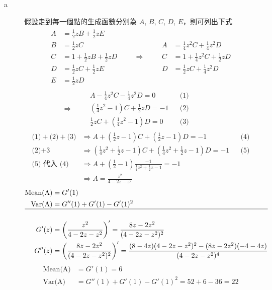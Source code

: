 \documentclass[11pt,fleqn]{article}
\begin{document}
\begin{description}
	\item[a] 假設走到每一個點的生成函數分別為 $A$, $B$, $C$, $D$, $E$，則可列出下式
		\begin{align*}
			\begin{aligned}
				A &= \frac{1}{2}z B + \frac{1}{2}z E\\
				B &= \frac{1}{2}z C\\
				C &= 1 + \frac{1}{2}z B + \frac{1}{2} z D\\
				D &= \frac{1}{2}z C + \frac{1}{2} z E\\
				E &= \frac{1}{2}z D 
			\end{aligned} \qquad
			\Rightarrow \qquad
			\begin{aligned}
				A &= \frac{1}{4}z^2 C + \frac{1}{4}z^2 D\\
				C &= 1 + \frac{1}{4}z^2 C + \frac{1}{2} z D\\
				D &= \frac{1}{2}z C + \frac{1}{4} z^2 D
			\end{aligned} \\
			\qquad
			\Rightarrow \qquad
			\begin{aligned}
				A - \frac{1}{4}z^2 C - \frac{1}{4}z^2 D = 0 && \text{(1)}\\
				\left(\frac{1}{4}z^2-1\right) C + \frac{1}{2} z D = -1 && \text{(2)}\\
				\frac{1}{2}z C + \left(\frac{1}{4} z^2 - 1\right) D = 0 && \text{(3)}
			\end{aligned}
		\end{align*}
		\begin{align*}
			\hline
			\text{(1)} + \text{(2)} + \text{(3)} 
				& \Rightarrow 
					A + \left(\frac{1}{2} z - 1\right) C +
								\left(\frac{1}{2} z - 1\right) D = -1
					&& \text{(4)} \\
			\text{(2)} + \text{3}
				& \Rightarrow 
					\left(\frac{1}{4}z^2 + \frac{1}{2}z - 1\right) C +
						\left(\frac{1}{4}z^2 + \frac{1}{2}z - 1\right) D = -1
					&& \text{(5)} \\
			\text{(5) 代入 (4)}
				& \Rightarrow
					A + \left(\frac{1}{2}-1\right) 
						\frac{-1}{\frac{1}{4}z^2 + \frac{1}{2}z -1} = -1 \\
				& \Rightarrow
					A = \frac{z^2}{4 - 2z - z^2}
		\end{align*}
		\begin{align*}
			\text{Mean(A)} &= {G}'(1) \\
			\text{Var(A)} &= {G}''(1) + {G}'(1) - {G}'(1)^2 \\
			\hline \\
			{G}'(z) &= {\left(\frac{z^2}{4 - 2z - z^2}\right)}' 
					= \frac{8z-2z^2}{(4-2z-z^2)^2} \\
			{G}''(z) &= {\left(\frac{8z-2z^2}{(4-2z-z^2)^2}\right)}' 
					= \frac{(8-4z)(4-2z-z^2)^2 - (8z-2z^2)(-4-4z)}{(4-2z-z^2)^4}
		\end{align*}
		\begin{align*}
			\text{Mean(A)} &= {G}'(1) = 6 \\
			\text{Var(A)} &= {G}''(1) + {G}'(1) - {G}'(1)^2 = 52 + 6 - 36 = 22
		\end{align*}
		

\end{description}
\end{document}
